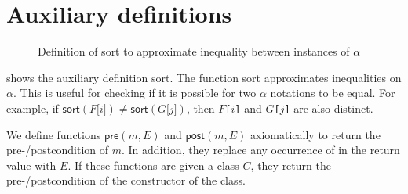 \section{Auxiliary definitions}

\begin{figure}[t]
\begin{adjustwidth}{-0.15\paperwidth}{-0.15\paperwidth}
\begin{mathpar}
\end{mathpar}
\end{adjustwidth}
\caption{Definition of \textsf{sort} to approximate inequality between instances of $\alpha$}\label{fig:aux}
\end{figure}

 shows the auxiliary definition \textsf{sort}.
The function \textsf{sort} approximates inequalities on $\alpha$. This is useful for checking if it is possible for two $\alpha$ notations to be equal. For example, if $\textsf{sort}(\texttt{$F$[$i$]}) \neq \textsf{sort}(\texttt{$G$[$j$]})$, then \texttt{$F$[$i$]} and \texttt{$G$[$j$]} are also distinct.

We define functions $\textsf{pre}(m, E)$ and $\textsf{post}(m, E)$ axiomatically to return the pre-/postcondition of $m$. In addition, they replace any occurrence of \kwthis{} in the return value with $E$. If these functions are given a class $C$, they return the pre-/postcondition of the constructor of the class.